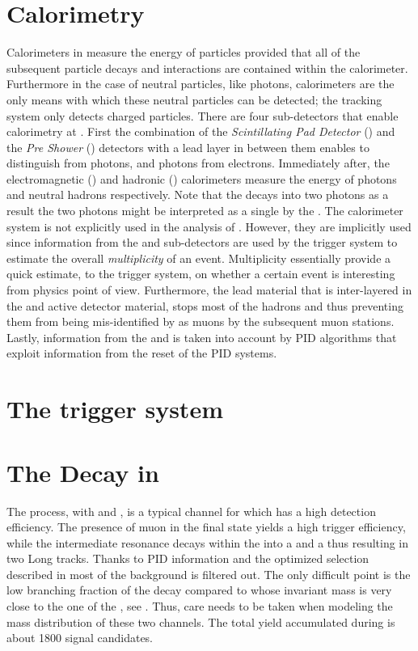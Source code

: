 \section{Calorimetry}
\label{det_calo}
Calorimeters in \lhcb measure the energy of particles provided that all of the subsequent particle decays
and interactions are contained within the calorimeter. Furthermore in the case of neutral particles, like photons,
calorimeters are the only means with which these neutral particles can be detected; the tracking system
only detects charged particles. There are four sub-detectors that enable calorimetry at \lhcb.
First the combination of the {\it Scintillating Pad Detector} (\spd)
and the {\it Pre Shower} (\presh) detectors with a lead layer in between them enables to distinguish \piz from
photons, and photons from electrons. Immediately after, the electromagnetic (\ecal) and hadronic (\hcal)
calorimeters measure the energy of photons and neutral hadrons respectively.
Note that the \piz decays into two photons as a result the two photons might be interpreted as a single by the \ecal.
The calorimeter system is not explicitly used in the analysis of .
However, they are implicitly used since information from the \spd and \presh sub-detectors are used
by the \lzero trigger system to estimate the overall {\it multiplicity} of an event. Multiplicity essentially
provide a quick estimate, to the \lzero trigger system, on whether a certain event is interesting from physics
point of view. Furthermore, the lead material that is inter-layered in the \ecal and \hcal active detector material,
stops most of the hadrons and thus preventing them from being mis-identified by as muons by the subsequent muon stations.
Lastly, information from the \ecal and \hcal is taken into account by PID algorithms that exploit information from
the reset of the PID systems.

\section{The trigger system}
\label{det_trigger}


\section{The \BsJpsiKst Decay in \lhcb}
\label{BspsiKst_at_lhcb}


The \BsJpsiKst process, with \Jpsimumu and \KstKpi, is a typical channel for which \lhcb has a high detection efficiency.
The presence of muon in the final state yields a high trigger efficiency, while the intermediate
\Kstarz resonance decays within the \velo into a \Kp and a \pim thus resulting in two Long tracks.
Thanks to PID information and the optimized selection described in  most of the background
is filtered out. The only difficult point is the low branching fraction of the \BsJpsiKst decay
compared to \BdJpsiKst whose invariant mass is very close to the one of the \BsJpsiKst, see .
Thus, care needs to be taken when modeling the mass distribution of these two channels.
The total \BsJpsiKst yield accumulated during \runone is about 1800 signal candidates.

